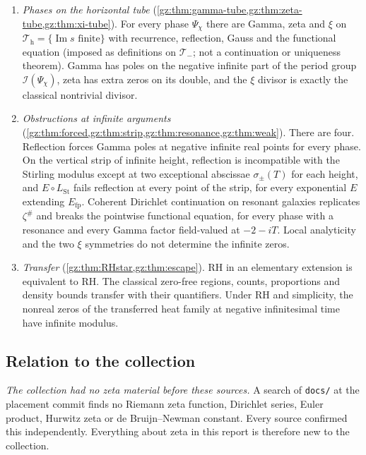 \documentclass[11pt,a4paper]{article}
\numberwithin{equation}{section}
\theoremstyle{definition}
\theoremstyle{remark}
\renewcommand{\Im}{\operatorname{Im}}
\newcommand{\Efp}{E_{\mathrm{fp}}}
\newcommand{\cI}{\mathcal I}
\newcommand{\LSt}{L_{\mathrm{St}}}
\newcommand{\zp}{\zeta^{\#}}
\newcommand{\Tm}{\mathcal T_{-}}
\newcommand{\Th}{\mathcal T_{\mathrm h}}
\begin{document}
\begin{enumerate}[label=(\arabic*),leftmargin=2.2em]
\item \emph{Phases on the horizontal tube} (\cref{gz:thm:gamma-tube,gz:thm:zeta-tube,gz:thm:xi-tube}).
 For every phase $\Psi_\chi$ there are Gamma, zeta and $\xi$ on
 $\Th=\{\Im s\text{ finite}\}$ with recurrence, reflection, Gauss and the
 functional equation (imposed as definitions on $\Tm$; not a continuation
 or uniqueness theorem). Gamma has poles on the negative infinite part of the
 period group $\cI(\Psi_\chi)$, zeta has extra zeros on its double, and the
 $\xi$ divisor is exactly the classical nontrivial divisor.
\item \emph{Obstructions at infinite arguments}
 (\cref{gz:thm:forced,gz:thm:strip,gz:thm:resonance,gz:thm:weak}). There
 are four. Reflection forces Gamma poles at negative infinite real points
 for every phase. On the vertical strip of infinite height, reflection is
 incompatible with the Stirling modulus except at two exceptional abscissae
 $\sigma_\pm(T)$ for each height, and $E\circ\LSt$ fails reflection at
 every point of the strip, for every exponential $E$ extending $\Efp$.
 Coherent Dirichlet continuation on resonant galaxies
 replicates $\zp$ and breaks the pointwise functional equation, for every
 phase with a resonance and every Gamma factor field-valued at $-2-iT$.
 Local analyticity and the two $\xi$ symmetries do
 not determine the infinite zeros.
\item \emph{Transfer} (\cref{gz:thm:RHstar,gz:thm:escape}). RH in an
 elementary extension is equivalent to RH. The classical zero-free
 regions, counts, proportions and density bounds transfer with their
 quantifiers. Under RH and simplicity, the nonreal zeros of the transferred
 heat family at negative infinitesimal time have infinite modulus.
\end{enumerate}

\subsection{Relation to the collection}\label{gz:sec:collection}
\emph{The collection had no zeta material before these sources.} A search of
\texttt{docs/} at the placement commit finds no Riemann zeta function,
Dirichlet series, Euler product, Hurwitz zeta or de Bruijn--Newman constant.
Every source confirmed this independently. Everything about zeta in this
report is therefore new to the collection.
\end{document}
